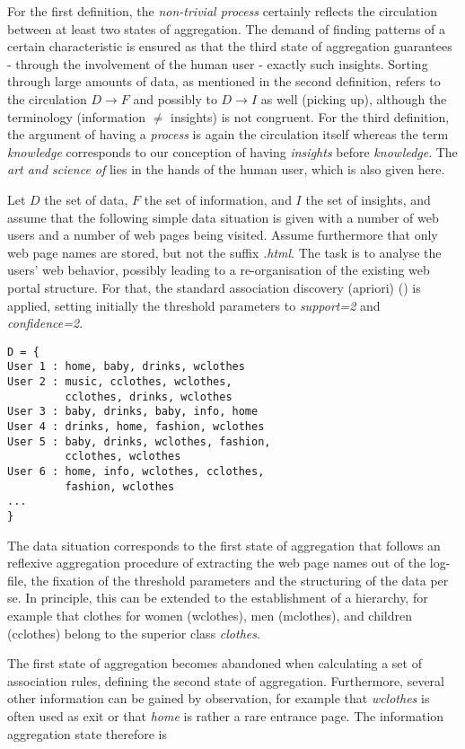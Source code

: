 \documentclass[10pt,latex8]{article}
\begin{document}
For the first definition, the \textit{non-trivial process} certainly reflects the circulation between at least two states of aggregation. The demand of finding patterns of a certain characteristic is ensured as that the third state of aggregation guarantees - through the involvement of the human user - exactly such insights. Sorting through large amounts of data, as mentioned in the second definition, refers to the circulation $D\rightarrow F$ and possibly to $D\rightarrow I$ as well (picking up), although the terminology (information $\neq$ insights) is not congruent. For the third definition, the argument of having a \textit{process} is again the circulation itself whereas the term \textit{knowledge} corresponds to our conception of having \textit{insights} before \textit{knowledge}. The \textit{art and science of} lies in the hands of the human user, which is also given here.

Let $D$ the set of data, $F$ the set of information, and $I$ the set of insights, and assume that the following simple data situation is given with a number of web users and a number of web pages being visited. Assume furthermore that only web page names are stored, but not the suffix \textit{.html}. The task is to analyse the users' web behavior, possibly leading to a re-organisation of the existing web portal structure. For that, the standard association discovery (apriori) (\cite{agrawal}) is applied, setting initially the threshold parameters to \textit{support=2} and \textit{confidence=2}.

{\small
\begin{verbatim}
D = {
User 1 : home, baby, drinks, wclothes
User 2 : music, cclothes, wclothes,
         cclothes, drinks, wclothes
User 3 : baby, drinks, baby, info, home 
User 4 : drinks, home, fashion, wclothes 
User 5 : baby, drinks, wclothes, fashion,
         cclothes, wclothes
User 6 : home, info, wclothes, cclothes,
         fashion, wclothes 
...
}
\end{verbatim}
}
The data situation corresponds to the first state of aggregation that follows an reflexive aggregation procedure of extracting the web page names out of the log-file, the fixation of the threshold parameters and the structuring of the data per se. In principle, this can be extended to the establishment of a hierarchy, for example that clothes for women (wclothes), men (mclothes), and children (cclothes) belong to the superior class \textit{clothes}.

The first state of aggregation becomes abandoned when calculating a set of association rules, defining the second state of aggregation. Furthermore, several other information can be gained by observation, for example that \textit{wclothes} is often used as exit or that \textit{home} is rather a rare entrance page. The information aggregation state therefore is 
\end{document}
